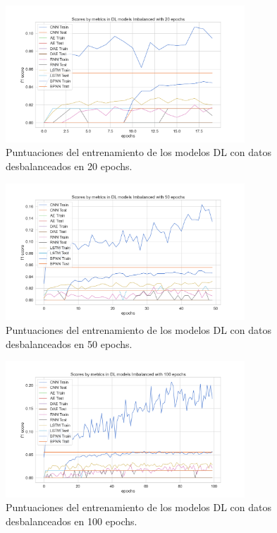 \begin{figure}[h!]
	\centering
	\includegraphics[width=0.8\textwidth]{"figuras/Experimento5/Imbalanced/DL_imbalanced_20_train"}
	\caption{Puntuaciones del entrenamiento de los modelos DL con datos desbalanceados en 20 epochs.}
	\label{an:8}
\end{figure}

\begin{figure}[h!]
	\centering
	\includegraphics[width=0.8\textwidth]{"figuras/Experimento5/Imbalanced/DL_imbalanced_50_train"}
	\caption{Puntuaciones del entrenamiento de los modelos DL con datos desbalanceados en 50 epochs.}
	\label{an:9}
\end{figure}

\begin{figure}[h!]
	\centering
	\includegraphics[width=0.8\textwidth]{"figuras/Experimento5/Imbalanced/DL_imbalanced_100_train"}
	\caption{Puntuaciones del entrenamiento de los modelos DL con datos desbalanceados en 100 epochs.}
	\label{an:10}
\end{figure}

